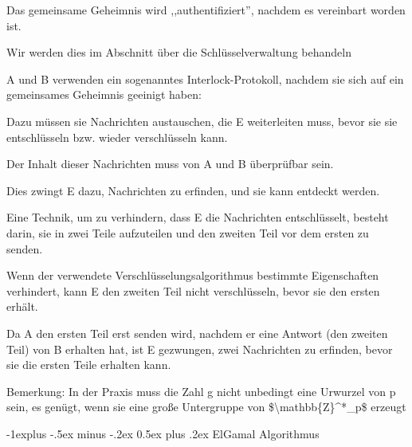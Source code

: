 \documentclass[a4paper]{article}
\makeatletter
\renewcommand{\subsection}{\@startsection{subsection}{2}{0mm}%
 {-1explus -.5ex minus -.2ex}%
 {0.5ex plus .2ex}%
 {\normalfont\normalsize\bfseries}}
\makeatother
\begin{document}
\begin{multicols}{3}
\begin{itemize*}
            \begin{itemize*}
                  \item Das gemeinsame Geheimnis wird ,,authentifiziert'', nachdem es vereinbart worden ist.
                  \begin{itemize*} \item Wir werden dies im Abschnitt über die Schlüsselverwaltung behandeln \end{itemize*}
                  \item A und B verwenden ein sogenanntes Interlock-Protokoll, nachdem sie sich auf ein gemeinsames Geheimnis geeinigt haben:
                  \begin{itemize*} \item Dazu müssen sie Nachrichten austauschen, die E weiterleiten muss, bevor sie sie entschlüsseln bzw. wieder verschlüsseln kann. \item Der Inhalt dieser Nachrichten muss von A und B überprüfbar sein. \item Dies zwingt E dazu, Nachrichten zu erfinden, und sie kann entdeckt werden. \item Eine Technik, um zu verhindern, dass E die Nachrichten entschlüsselt, besteht darin, sie in zwei Teile aufzuteilen und den zweiten Teil vor dem ersten zu senden.
                        \begin{itemize*} \item Wenn der verwendete Verschlüsselungsalgorithmus bestimmte Eigenschaften verhindert, kann E den zweiten Teil nicht verschlüsseln, bevor sie den ersten erhält. \item Da A den ersten Teil erst senden wird, nachdem er eine Antwort (den zweiten Teil) von B erhalten hat, ist E gezwungen, zwei Nachrichten zu erfinden, bevor sie die ersten Teile erhalten kann. \end{itemize*} \end{itemize*}
            \end{itemize*}
            \item
            Bemerkung: In der Praxis muss die Zahl g nicht unbedingt eine Urwurzel
            von p sein, es genügt, wenn sie eine große Untergruppe von
            \$\textbackslash mathbb\{Z\}\^{}*\_p\$ erzeugt
      \end{itemize*}


      \subsection{ElGamal Algorithmus}


\end{multicols}
\end{document}
